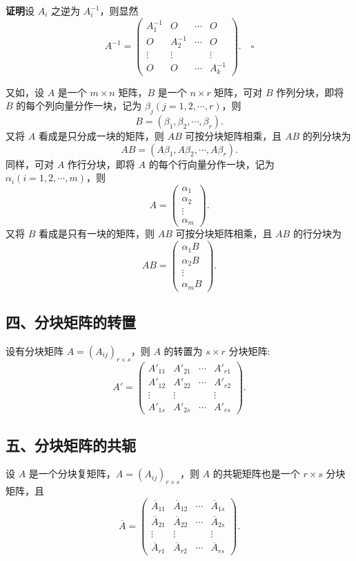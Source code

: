 \documentclass[UTF8,12pt,a4paper,fontset=fandol]{ctexart}
\begin{document}
\noindent\textbf{证明}\quad 设 $A_i$ 之逆为 $A_i^{-1}$，则显然
\[
A^{-1}=\left(\begin{array}{cccc}
A_1^{-1} & O & \cdots & O\\
O & A_2^{-1} & \cdots & O\\
\vdots & \vdots & & \vdots\\
O & O & \cdots & A_k^{-1}
\end{array}\right). \quad \square
\]

又如，设 $A$ 是一个 $m\times n$ 矩阵，$B$ 是一个 $n\times r$ 矩阵，可对 $B$ 作列分块，即将 $B$ 的每个列向量分作一块，记为 $\beta_j(j=1,2,\cdots,r)$，则
\[
B=(\beta_1,\beta_2,\cdots,\beta_r).
\]
又将 $A$ 看成是只分成一块的矩阵，则 $AB$ 可按分块矩阵相乘，且 $AB$ 的列分块为
\[
AB=(A\beta_1,A\beta_2,\cdots,A\beta_r).
\]
同样，可对 $A$ 作行分块，即将 $A$ 的每个行向量分作一块，记为 $\alpha_i(i=1,2,\cdots,m)$，则
\[
A=\left(\begin{array}{c}
\alpha_1\\
\alpha_2\\
\vdots\\
\alpha_m
\end{array}\right).
\]
又将 $B$ 看成是只有一块的矩阵，则 $AB$ 可按分块矩阵相乘，且 $AB$ 的行分块为
\[
AB=\left(\begin{array}{c}
\alpha_1B\\
\alpha_2B\\
\vdots\\
\alpha_mB
\end{array}\right).
\]

\subsection*{四、分块矩阵的转置}

设有分块矩阵 $A=(A_{ij})_{r\times s}$，则 $A$ 的转置为 $s\times r$ 分块矩阵:
\[
A'=\left(\begin{array}{cccc}
A'_{11} & A'_{21} & \cdots & A'_{r1}\\
A'_{12} & A'_{22} & \cdots & A'_{r2}\\
\vdots & \vdots & & \vdots\\
A'_{1s} & A'_{2s} & \cdots & A'_{rs}
\end{array}\right).
\]

\subsection*{五、分块矩阵的共轭}

设 $A$ 是一个分块复矩阵，$A=(A_{ij})_{r\times s}$，则 $A$ 的共轭矩阵也是一个 $r\times s$ 分块矩阵，且
\[
\overline{A}=\left(\begin{array}{cccc}
\overline{A}_{11} & \overline{A}_{12} & \cdots & \overline{A}_{1s}\\
\overline{A}_{21} & \overline{A}_{22} & \cdots & \overline{A}_{2s}\\
\vdots & \vdots & & \vdots\\
\overline{A}_{r1} & \overline{A}_{r2} & \cdots & \overline{A}_{rs}
\end{array}\right).
\]
\end{document}
